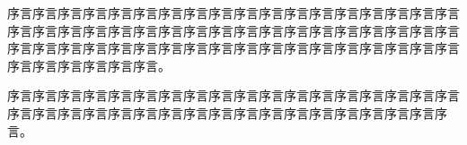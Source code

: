 \cleardoublepage
{}

序言序言序言序言序言序言序言序言序言序言序言序言序言序言序言序言序言序言序言序言序言序言序言序言序言序言序言序言序言序言序言序言序言序言序言序言序言序言序言序言序言序言序言序言序言序言序言序言序言序言序言序言序言序言序言序言序言序言序言序言。

序言序言序言序言序言序言序言序言序言序言序言序言序言序言序言序言序言序言序言序言序言序言序言序言序言序言序言序言序言序言序言序言序言序言序言序言。